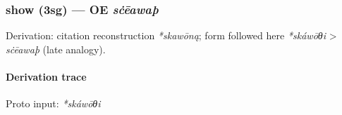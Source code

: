\documentclass[
  british,
  a4paper,
]{article}
\begin{document}
\subsubsection{\texorpdfstring{show (3sg) --- OE
\emph{sċēawaþ}}{show (3sg) --- OE sċēawaþ}}\label{show-3sg-oe-sux10bux113awauxfe}

Derivation: citation reconstruction \emph{*skawōną}; form followed here
\emph{*skáwōθi} \textgreater{} \emph{sċēawaþ} (late analogy).

\paragraph{Derivation trace}\label{derivation-trace-169}

Proto input: \emph{*skáwōθi}

\begingroup
\setlength{\fboxsep}{6pt}
\end{document}
